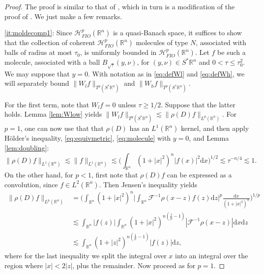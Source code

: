 \documentclass{amsart}
\newcommand {\ud}{\mathrm{d}}
\newcommand {\F}{\mathcal{F}}
\newcommand {\Hp}{\mathcal{H}^{p}_{FIO}(\Rn)}
\newcommand {\Rn}{\mathbb{R}^{n}}
\newcommand {\Sp}{S^{*}\Rn}
\theoremstyle{definition}
\numberwithin{equation}{section}
\begin{document}
\begin{proof}
The proof is similar to that %
of \cite[Theorem 8.3]{HaPoRo20}, which in turn is a modification of the proof of \cite[Theorem 3.6]{Smith98a}. We just make a few remarks.

\eqref{it:moldecomp1}: Since $\Hp$ is a quasi-Banach space, it suffices to show that the collection of coherent $\Hp$ molecules of type $N$, associated with balls of radius at most $\tau_{0}$, is uniformly bounded in $\Hp$. Let $f$ be such a molecule, associated with a ball $B_{\sqrt{\tau}}(y,\nu)$, for $(y,\nu)\in\Sp$ and $0<\tau\leq \tau_{0}^{2}$. We may suppose that $y=0$. With notation as in \eqref{eq:defWl} and \eqref{eq:defWh}, we will separately bound $\|W_{l}f\|_{T^{p}(\Sp)}$ and $\|W_{h}f\|_{T^{p}(\Sp)}$. 

For the first term, note that $W_{l}f=0$ unless $\tau\geq 1/2$. Suppose that the latter holds. Lemma \ref{lem:Wlow} yields $\|W_{l}f\|_{T^{p}(\Sp)}\lesssim \|\rho(D)f\|_{L^{p}(\Rn)}$. For $p=1$, one can now use that that $\rho(D)$ has an $L^{1}(\Rn)$ kernel, and then apply H\"{o}lder's inequality, \eqref{eq:equivmetric}, \eqref{eq:molecule} with $y=0$, and Lemma \ref{lem:doubling}:
\[
\|\rho(D)f\|_{L^{1}(\Rn)}\lesssim \|f\|_{L^{1}(\Rn)}\lesssim \Big(\int_{\Rn}(1+|x|^{2})^{n}|f(x)|^{2}\ud x\Big)^{1/2}\lesssim \tau^{-n/4}\lesssim 1.
\]
On the other hand, for $p<1$, first note that $\rho(D)f$ can be expressed as a convolution, since $f\in L^{2}(\Rn)$. Then Jensen's inequality yields
\begin{align*}
\|\rho(D)f\|_{L^{p}(\Rn)}&=\Big(\int_{\Rn}(1+|x|^{2})^{n}\Big|\int_{\Rn}\F^{-1}\rho(x-z)f(z)\ud z\Big|^{p}\frac{\ud x}{(1+|x|^{2})^{n}}\Big)^{1/p}\\
&\lesssim \int_{\Rn}|f(z)|\int_{\Rn}(1+|x|^{2})^{n(\frac{1}{p}-1)}|\F^{-1}\rho(x-z)|\ud x\ud z\\
&\lesssim \int_{\Rn}(1+|z|^{2})^{n(\frac{1}{p}-1)}|f(z)|\ud z,%
\end{align*}
where for the last inequality we split the integral over $x$ into an integral over the region where $|x|<2|z|$, plus the remainder. Now proceed as for $p=1$.





\end{proof}
\end{document}
